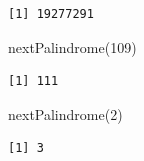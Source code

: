 \documentclass[
  letterpaper,
  DIV=11,
  numbers=noendperiod]{scrartcl}
\newenvironment{Shaded}{\begin{snugshade}}{\end{snugshade}}
\newcommand{\DecValTok}[1]{\textcolor[rgb]{0.68,0.00,0.00}{#1}}
\newcommand{\FunctionTok}[1]{\textcolor[rgb]{0.28,0.35,0.67}{#1}}
\newcommand{\NormalTok}[1]{\textcolor[rgb]{0.00,0.23,0.31}{#1}}
\begin{document}
\begin{verbatim}
[1] 19277291
\end{verbatim}

\begin{Shaded}
\begin{Highlighting}[]
\FunctionTok{nextPalindrome}\NormalTok{(}\DecValTok{109}\NormalTok{)}
\end{Highlighting}
\end{Shaded}

\begin{verbatim}
[1] 111
\end{verbatim}

\begin{Shaded}
\begin{Highlighting}[]
\FunctionTok{nextPalindrome}\NormalTok{(}\DecValTok{2}\NormalTok{)}
\end{Highlighting}
\end{Shaded}

\begin{verbatim}
[1] 3
\end{verbatim}
\end{document}
